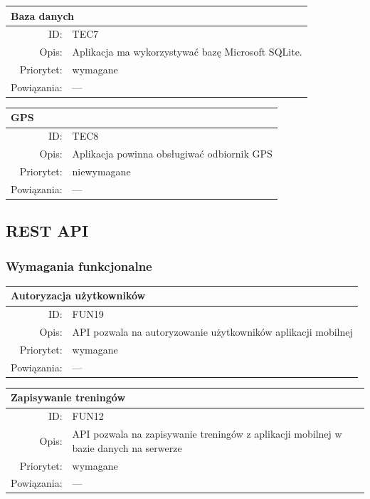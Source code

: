       \begin{center}
      \begin{tabular}{rp{10cm}}
        \multicolumn{2}{l}{\textbf{Baza danych}} \\
        \hline
        ID: & TEC7 \\
        Opis: & Aplikacja ma wykorzystywać bazę Microsoft SQLite. \\
        Priorytet: & wymagane \\
        Powiązania: & --- \\
      \end{tabular}
      \end{center}



      \begin{center}
      \begin{tabular}{rp{10cm}}
        \multicolumn{2}{l}{\textbf{GPS}} \\
        \hline
        ID: & TEC8 \\
        Opis: & Aplikacja powinna obsługiwać odbiornik GPS \\
        Priorytet: & niewymagane \\
        Powiązania: & --- \\
      \end{tabular}
      \end{center}

\subsection{REST API} %
\subsubsection{Wymagania funkcjonalne}
\label{sub:aplikacja_mobilna}
\begin{center}
      \begin{tabular}{rp{10cm}}
	      \multicolumn{2}{l}{\textbf{Autoryzacja użytkowników}} \\
	      \hline
	      ID: & FUN19 \\
	      Opis: & API pozwala na autoryzowanie użytkowników aplikacji mobilnej \\
	      Priorytet: & wymagane \\
	      Powiązania: & --- \\
    \end{tabular}
\end{center}

\begin{center}
      \begin{tabular}{rp{10cm}}
	      \multicolumn{2}{l}{\textbf{Zapisywanie treningów}} \\
	      \hline
	      ID: & FUN12 \\
	      Opis: & API pozwala na zapisywanie treningów z aplikacji mobilnej w bazie danych na serwerze \\
	      Priorytet: & wymagane \\
	      Powiązania: & --- \\
    \end{tabular}
\end{center}

